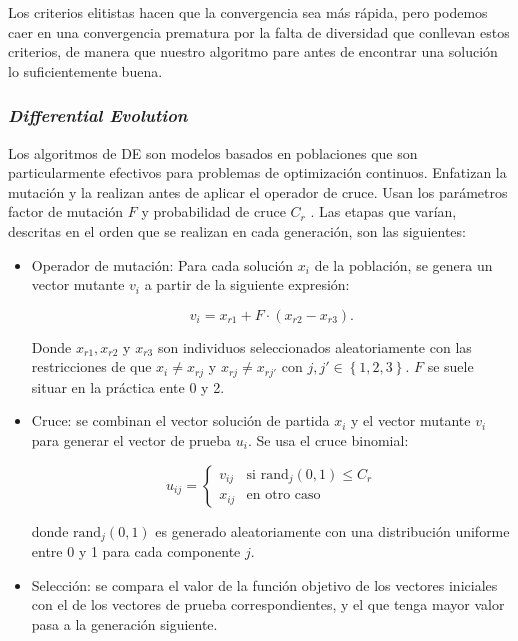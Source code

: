 Los criterios elitistas hacen que la convergencia sea más rápida, pero podemos caer en una convergencia prematura por la falta de diversidad que conllevan estos criterios, de manera que nuestro algoritmo pare antes de encontrar una solución lo suficientemente buena.



\subsubsection{\textit{Differential Evolution}}


Los algoritmos de DE \cite{diffev} son modelos basados en poblaciones que son particularmente efectivos para problemas de optimización continuos. Enfatizan la mutación y la realizan antes de aplicar el operador de cruce. Usan los parámetros factor de mutación $F$ y probabilidad de cruce $C_r$ \cite{diffevbook}. Las etapas que varían, descritas en el orden que se realizan en cada generación, son las siguientes:

\begin{itemize}
	\item{Operador de mutación: Para cada solución $x_i$ de la población, se genera un vector mutante $v_i$ a partir de la siguiente expresión:
	
	$$v_i = x_{r1} + F \cdot (x_{r2} - x_{r3}).$$
	
	Donde $x_{r1}, x_{r2}$ y $x_{r3}$ son individuos seleccionados aleatoriamente con las restricciones de que $x_i  \neq x_{rj}$ y $x_{rj} \neq x_{rj'}$ con $j, j' \in \left \{ 1,2,3 \right \}$. $F$ se suele situar en la práctica ente 0 y 2.		
	}
	
	\item{Cruce: se combinan el vector solución de partida $x_i$ y el vector mutante $v_i$ para generar el vector de prueba $u_i$. Se usa el cruce binomial:
	
	$$u_{ij} = \begin{cases}
		v_{ij} & \text{si } \text{rand}_j(0,1) \leq C_r \\
		x_{ij} & \text{en otro caso}
		\end{cases} $$
		
		donde $\text{rand}_j(0,1)$ es generado aleatoriamente con una distribución uniforme entre 0 y 1 para cada componente $j$.	
	}
	
	\item{Selección: se compara el valor de la función objetivo de los vectores iniciales con el de los vectores de prueba correspondientes, y el que tenga mayor valor pasa a la generación siguiente.}

\end{itemize}

